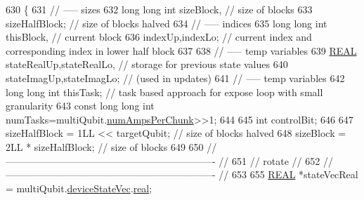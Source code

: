 \begin{DoxyCode}
630                                                                                                            
                          \{
631     \textcolor{comment}{// ----- sizes}
632     \textcolor{keywordtype}{long} \textcolor{keywordtype}{long} \textcolor{keywordtype}{int} sizeBlock,                                           \textcolor{comment}{// size of blocks}
633          sizeHalfBlock;                                       \textcolor{comment}{// size of blocks halved}
634     \textcolor{comment}{// ----- indices}
635     \textcolor{keywordtype}{long} \textcolor{keywordtype}{long} \textcolor{keywordtype}{int} thisBlock,                                           \textcolor{comment}{// current block}
636          indexUp,indexLo;                                     \textcolor{comment}{// current index and corresponding index in
       lower half block}
637 
638     \textcolor{comment}{// ----- temp variables}
639     \mbox{\hyperlink{QuEST__precision_8h_a4b654506f18b8bfd61ad2a29a7e38c25}{REAL}}   stateRealUp,stateRealLo,                             \textcolor{comment}{// storage for previous state values}
640            stateImagUp,stateImagLo;                             \textcolor{comment}{// (used in updates)}
641     \textcolor{comment}{// ----- temp variables}
642     \textcolor{keywordtype}{long} \textcolor{keywordtype}{long} \textcolor{keywordtype}{int} thisTask;                                   \textcolor{comment}{// task based approach for expose loop with
       small granularity}
643     \textcolor{keyword}{const} \textcolor{keywordtype}{long} \textcolor{keywordtype}{long} \textcolor{keywordtype}{int} numTasks=multiQubit.\mbox{\hyperlink{structMultiQubit_a1cad83601a78635dd278259c7ed54f18}{numAmpsPerChunk}}>>1;
644 
645     \textcolor{keywordtype}{int} controlBit;
646 
647     sizeHalfBlock = 1LL << targetQubit;                               \textcolor{comment}{// size of blocks halved}
648     sizeBlock     = 2LL * sizeHalfBlock;                           \textcolor{comment}{// size of blocks}
649 
650     \textcolor{comment}{// ---------------------------------------------------------------- //}
651     \textcolor{comment}{//            rotate                                                //}
652     \textcolor{comment}{// ---------------------------------------------------------------- //}
653 
655     \mbox{\hyperlink{QuEST__precision_8h_a4b654506f18b8bfd61ad2a29a7e38c25}{REAL}} *stateVecReal = multiQubit.\mbox{\hyperlink{structMultiQubit_a59ac613486a41b8c9a4b6e79cc8d2cc3}{deviceStateVec}}.\mbox{\hyperlink{structComplexArray_a4195cac6c784ea1b6271f1c7dba1548a}{real}};

\end{DoxyCode}
